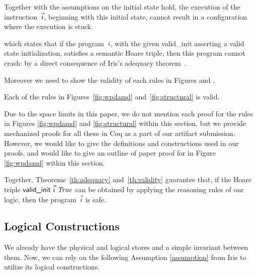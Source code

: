 \begin{theorem}
  \label{th:adequacy}
 Together with the assumptions on the initial state hold,
 the execution of the instruction~$\vec{i}$, beginning with this initial state, cannot result in a configuration where the execution is stuck.
\end{theorem}
which states that if the program~$i$, with the given \textsf{valid\_init} asserting a valid state initialization, satisfies a semantic Hoare
triple, then this program cannot crash: by a direct consequence of Iris's adequacy theorem~\cite[\S6.4]{iris}.

Moreover we need to show the validity of each rules in Figures  and .
\begin{theorem}
\label{th:validity}
  Each of the rules in Figures~\ref{fig:wpdamd}
  and~\ref{fig:structural} is valid.
\end{theorem}
Due to the space limits in this paper, we do not mention each proof for the rules in Figures \ref{fig:wpdamd} and \ref{fig:structural} within this section, but we provide mechanized proofs for all these in Coq as a part of our artifact submission.
However, we would like to give the definitions and constructions used in our proofs, and would like to give an outline of paper proof for  in Figure \ref{fig:wpdamd} within this section.

Together, Theorems~\ref{th:adequacy} and~\ref{th:validity} guarantee that, if
the Hoare triple $\textsf{valid\_init }\vec{i}\;\mathit{True}$ can be obtained by applying
the reasoning rules of our logic, then the program~$\vec{i}$ is safe.

\subsection{Logical Constructions}
\label{sec:invariant}
We already have the physical and logical stores and a simple invariant between them. Now, we can rely on the following Assumption \ref{assumption} from Iris to utilize its logical constructions.
\newcommand{\genheapinterp}[1]{\mathit{Heap}\;#1}
\newcommand{\genmemheapinterp}[1]{\mathit{MemHeap}\;#1}
\newcommand{\pred}[1]{\ownGhost\gammaPred{\authfull{(\mapone\predstore)}}}
\newcommand{\mapone}[1]{1.#1}
\newcommand{\mapsfromexact}[3]{
  \ownGhost\gammaPred{\authfrag{\singletonMap{#1}{(#2, #3)}}}
}
\newcommand{\sh}{L'}
\newcommand{\mapsfromdef}[3]{
  \exists\sh.\;
  \mapsfromexact{#1}{#2}{\sh} \star \pure{\sh \subseteq #3}
}

